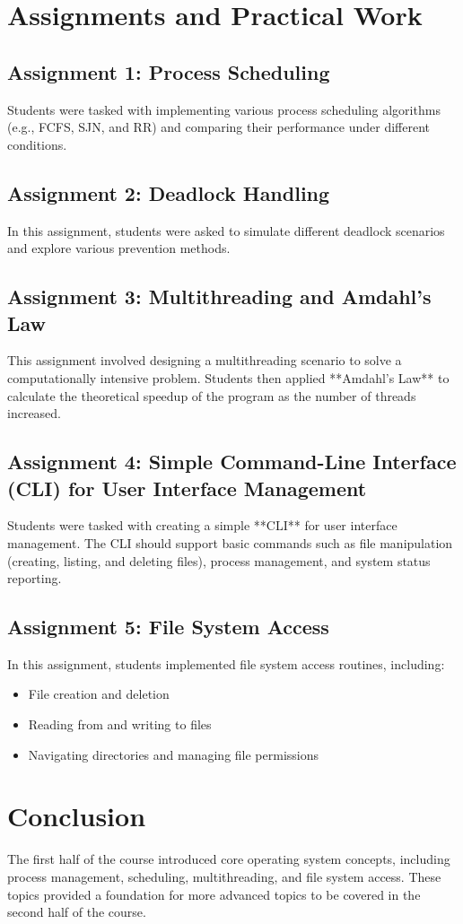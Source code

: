 \documentclass[12pt]{article}
\begin{document}
\section{Assignments and Practical Work}
\subsection{Assignment 1: Process Scheduling}
Students were tasked with implementing various process scheduling algorithms (e.g., FCFS, SJN, and RR) and comparing their performance under different conditions.

\subsection{Assignment 2: Deadlock Handling}
In this assignment, students were asked to simulate different deadlock scenarios and explore various prevention methods.

\subsection{Assignment 3: Multithreading and Amdahl's Law}
This assignment involved designing a multithreading scenario to solve a computationally intensive problem. Students then applied **Amdahl's Law** to calculate the theoretical speedup of the program as the number of threads increased.

\subsection{Assignment 4: Simple Command-Line Interface (CLI) for User Interface Management}
Students were tasked with creating a simple **CLI** for user interface management. The CLI should support basic commands such as file manipulation (creating, listing, and deleting files), process management, and system status reporting.

\subsection{Assignment 5: File System Access}
In this assignment, students implemented file system access routines, including:
\begin{itemize}
    \item File creation and deletion
    \item Reading from and writing to files
    \item Navigating directories and managing file permissions
\end{itemize}

\section{Conclusion}
The first half of the course introduced core operating system concepts, including process management, scheduling, multithreading, and file system access. These topics provided a foundation for more advanced topics to be covered in the second half of the course.
\end{document}
